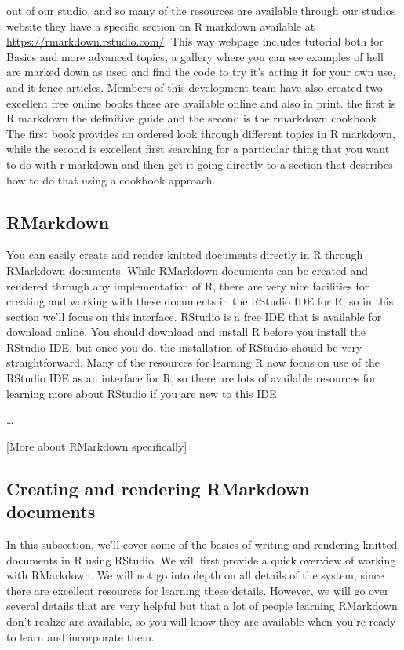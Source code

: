 \documentclass[]{tufte-book}
\begin{document}
out of our studio, and so many of the resources are available through our
studios website they have a specific section on R markdown available at
\url{https://rmarkdown.rstudio.com/}. This way webpage includes tutorial both for
Basics and more advanced topics, a gallery where you can see examples of hell
are marked down as used and find the code to try it's acting it for your own
use, and it fence articles. Members of this development team have also created
two excellent free online books these are available online and also in print.
the first is R markdown the definitive guide and the second is the rmarkdown
cookbook. The first book provides an ordered look through different topics in R
markdown, while the second is excellent first searching for a particular thing
that you want to do with r markdown and then get it going directly to a section
that describes how to do that using a cookbook approach.

\hypertarget{rmarkdown}{%
\subsection{RMarkdown}\label{rmarkdown}}

You can easily create and render knitted documents directly in R through RMarkdown
documents. While RMarkdown documents can be created and rendered through any
implementation of R, there are very nice facilities for creating and working with
these documents in the RStudio IDE for R, so in this section we'll focus on
this interface. RStudio is a free IDE that is available for download online.
You should download and install R before you install the RStudio IDE, but once you
do, the installation of RStudio should be very straightforward. Many of the
resources for learning R now focus on use of the RStudio IDE as an interface for
R, so there are lots of available resources for learning more about RStudio if you
are new to this IDE.

\ldots{}

{[}More about RMarkdown specifically{]}

\hypertarget{creating-and-rendering-rmarkdown-documents}{%
\subsection{Creating and rendering RMarkdown documents}\label{creating-and-rendering-rmarkdown-documents}}

In this subsection, we'll cover some of the basics of writing and rendering
knitted documents in R using RStudio. We will first provide a quick overview
of working with RMarkdown. We will not go into depth on all details of the
system, since there are excellent resources for learning these details. However,
we will go over several details that are very helpful but that a lot of people
learning RMarkdown don't realize are available, so you will know they are
available when you're ready to learn and incorporate them.
\end{document}

